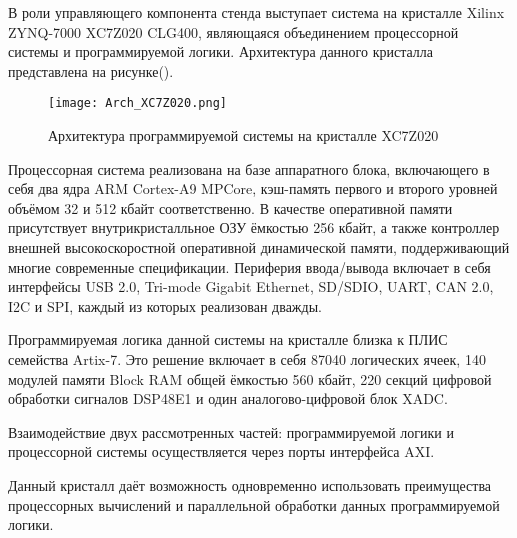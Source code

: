 В роли управляющего компонента стенда выступает система на кристалле Xilinx ZYNQ-7000 XC7Z020 CLG400, являющаяся объединением процессорной системы и программируемой логики. Архитектура данного кристалла представлена на рисунке().\par
\begin{figure}[ht]
    \centering
    \texttt{[image: Arch\_XC7Z020.png]}
    \caption{Архитектура программируемой системы на кристалле XC7Z020}
    \label{fig:mpr}
\end{figure}
Процессорная система реализована на базе аппаратного блока, включающего в себя два ядра ARM Cortex-A9 MPCore, кэш-память первого и второго уровней объёмом 32 и 512 кбайт соответственно. В качестве оперативной памяти присутствует внутрикристалльное ОЗУ ёмкостью 256 кбайт, а также контроллер внешней высокоскоростной оперативной динамической памяти, поддерживающий многие современные спецификации. Периферия ввода/вывода включает в себя интерфейсы USB 2.0, Tri-mode Gigabit Ethernet, SD/SDIO, UART, CAN 2.0, I2C и SPI, каждый из которых реализован дважды.\par
Программируемая логика данной системы на кристалле близка к ПЛИС семейства Artix-7. Это решение включает в себя 87040 логических ячеек, 140 модулей памяти Block RAM общей ёмкостью 560 кбайт, 220 секций цифровой обработки сигналов DSP48E1 и один аналогово-цифровой блок XADC.\par
Взаимодействие двух рассмотренных частей: программируемой логики и процессорной системы осуществляется через порты интерфейса AXI.\par
Данный кристалл даёт возможность одновременно использовать преимущества процессорных вычислений и параллельной обработки данных программируемой логики.
